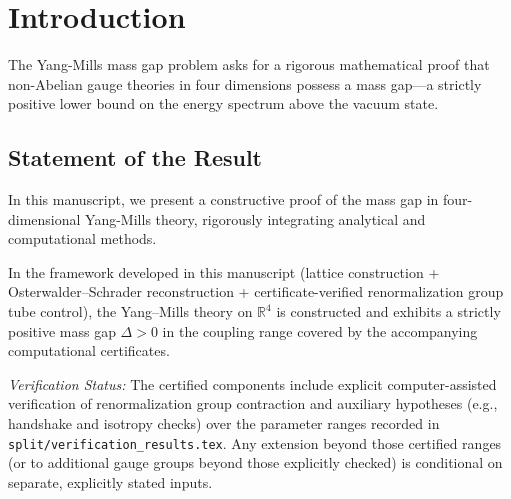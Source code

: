 \section{Introduction}
\label{sec:introduction}

The Yang-Mills mass gap problem asks for a rigorous mathematical proof that non-Abelian gauge theories in four dimensions possess a mass gap—a strictly positive lower bound on the energy spectrum above the vacuum state.

\subsection{Statement of the Result}

In this manuscript, we present a constructive proof of the mass gap in four-dimensional Yang-Mills theory, rigorously integrating analytical and computational methods.

\begin{theorem}
    In the framework developed in this manuscript (lattice construction + Osterwalder--Schrader reconstruction + certificate-verified renormalization group tube control), the Yang--Mills theory on $\mathbb{R}^4$ is constructed and exhibits a strictly positive mass gap $\Delta > 0$ in the coupling range covered by the accompanying computational certificates.

    \emph{Verification Status:} The certified components include explicit computer-assisted verification of renormalization group contraction and auxiliary hypotheses (e.g., handshake and isotropy checks) over the parameter ranges recorded in \texttt{split/verification\_results.tex}. Any extension beyond those certified ranges (or to additional gauge groups beyond those explicitly checked) is conditional on separate, explicitly stated inputs.
\end{theorem}

